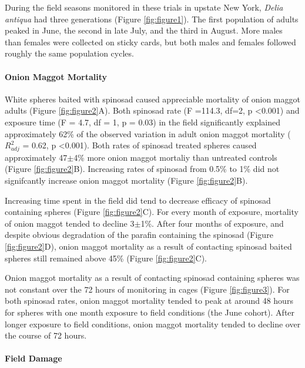 \documentclass[alpha-refs]{wiley-article}
\begin{document}
During the field seasons monitored in these trials in upstate New York, \textit{Delia antiqua} had three generations (Figure \ref{fig:figure1}).  The first population of adults peaked in June, the second in late July, and the third in August.  More males than females were collected on sticky cards, but both males and females followed roughly the same population cycles. 

\paragraph{Onion Maggot Mortality}

White spheres baited with spinosad caused appreciable mortality of onion maggot adults (Figure \ref{fig:figure2}A).  Both spinosad rate (F =114.3, df=2, p \textless 0.001)  and exposure time (F = 4.7, df = 1, p = 0.03) in the field significantly explained approximately 62\% of the observed variation in adult onion maggot mortality ($R^2_{adj}$ = 0.62, p \textless 0.001).  Both rates of spinosad treated spheres caused approximately 47$\pm$4\% more onion maggot mortaliy than untreated controls (Figure \ref{fig:figure2}B).  Increasing rates of spinosad from 0.5\% to 1\% did not signifcantly increase onion maggot mortality (Figure \ref{fig:figure2}B).  

Increasing time spent in the field did tend to decrease efficacy of spinosad containing spheres (Figure \ref{fig:figure2}C).  For every month of exposure, mortality of onion maggot tended to decline 3$\pm$1\%.  After four months of exposure, and despite obvious degradation of the parafin containing the spinosad (Figure \ref{fig:figure2}D), onion maggot mortality as a result of contacting spinosad baited spheres still remained above 45\% (Figure \ref{fig:figure2}C).  

Onion maggot mortality as a result of contacting spinosad containing spheres was not constant over the 72 hours of monitoring in cages (Figure \ref{fig:figure3}).  For both spinosad rates, onion maggot mortality tended to peak at around 48 hours for spheres with one month exposure to field conditions (the June cohort).  After longer exposure to field conditions, onion maggot mortality tended to decline over the course of 72 hours.  

\paragraph{Field Damage}
\end{document}
